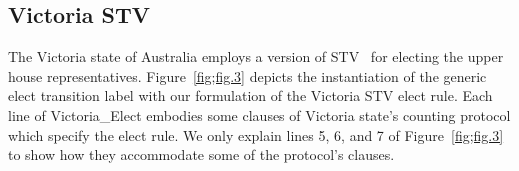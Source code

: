 \documentclass{llncs}
\begin{document}
\subsection{Victoria STV}
The Victoria state of Australia employs a version of
STV~\cite{ofVictoria:2002:EA} for  electing the upper house representatives. 
Figure~\ref{fig;fig.3} depicts the instantiation of the generic elect transition label with our formulation of the Victoria STV elect rule. Each line of {\selectfont Victoria\_Elect} embodies some clauses of Victoria state's counting protocol which specify the elect rule. We only explain lines 5, 6, and 7 of Figure~\ref{fig;fig.3} to show how they accommodate some  of the protocol's clauses. 
\end{document}
